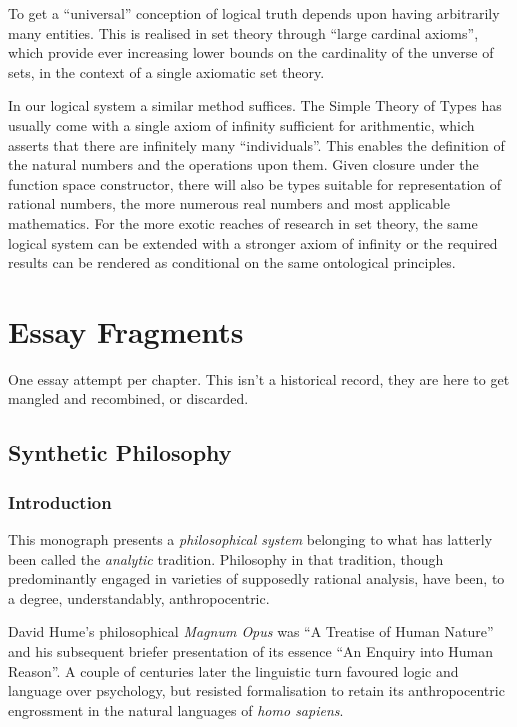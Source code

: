 \documentclass[10pt,titlepage]{book}
\begin{document}
To get a ``universal'' conception of logical truth depends upon having arbitrarily many entities.
This is realised in set theory through ``large cardinal axioms'', which provide ever increasing lower bounds on the cardinality of the unverse of sets, in the context of a single axiomatic set theory.

In our logical system a similar method suffices.
The Simple Theory of Types has usually come with a single axiom of infinity sufficient for arithmentic, which asserts that there are infinitely many ``individuals''.
This enables the definition of the natural numbers and the operations upon them.
Given closure under the function space constructor, there will also be types suitable for representation of rational numbers, the more numerous real numbers and most applicable mathematics.
For the more exotic reaches of research in set theory, the same logical system can be extended with a stronger axiom of infinity or the required results can be rendered as conditional on the same ontological principles. 

  
\part{Essay Fragments}

One essay attempt per chapter.
This isn't a historical record, they are here to get mangled and recombined, or discarded.

\chapter{Synthetic Philosophy}

\section{Introduction}

This monograph presents a \emph{philosophical system} belonging to what has latterly been called the \emph{analytic} tradition.
Philosophy in that tradition, though predominantly engaged in varieties of supposedly rational analysis, have been, to a degree, understandably, anthropocentric.

David Hume's philosophical \emph{Magnum Opus} was ``A Treatise of Human Nature'' \cite{humeTHN} and his subsequent briefer presentation of its essence ``An Enquiry into Human Reason''\cite{humeECHU}.
A couple of centuries later the linguistic turn favoured logic and language over psychology, but resisted formalisation to retain its anthropocentric engrossment in the natural languages of \emph{homo sapiens}.
\end{document}

